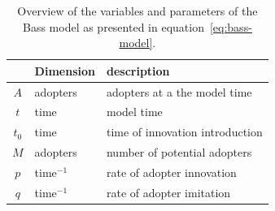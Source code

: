 \documentclass[smallextended,final]{svjour3}
\begin{document}
\begin{table}
\centering\small
\caption[Bass model variables and parameters]{Overview of the variables and parameters of the Bass model as presented in equation~\eqref{eq:bass-model}.}
\label{tbl:bass-model}
\begin{tabular}{cll}
\toprule
& Dimension & description \\
\midrule
$A$   & adopters    & adopters at a the model time \\
$t$   & time        & model time \\
\midrule
$t_0$ & time        & time of innovation introduction \\
$M$   & adopters    & number of potential adopters \\
$p$   & time$^{-1}$ & rate of adopter innovation \\
$q$   & time$^{-1}$ & rate of adopter imitation \\
\bottomrule
\end{tabular}
\end{table}
\end{document}
